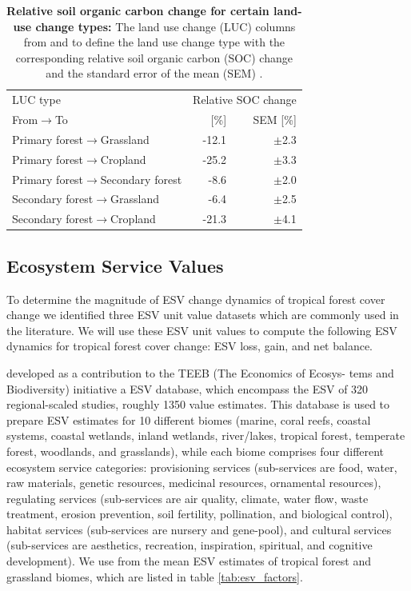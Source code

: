 		\begin{table}[ht]
			\centering
			\caption[Relative soil organic carbon change for certain land-use change types]{\textbf{Relative soil organic carbon change for certain land-use change types:} The land use change (LUC) columns from and to define the land use change type with the corresponding relative soil organic carbon (SOC) change and the standard error of the mean (SEM) \citep{Don2010}.}
			\label{tab:soc_factors}
			\begin{tabular}{lrr}
				\hline
				LUC type & \multicolumn{2}{c}{Relative SOC change} \\\cline{2-3}
				From$\rightarrow$To & [\%] & SEM [\%] \\\hline
				Primary forest$\rightarrow$Grassland & -12.1 & $\pm$2.3 \\
				Primary forest$\rightarrow$Cropland & -25.2 & $\pm$3.3 \\
				Primary forest$\rightarrow$Secondary forest & -8.6 & $\pm$2.0 \\
				Secondary forest$\rightarrow$Grassland & -6.4 & $\pm$2.5 \\
				Secondary forest$\rightarrow$Cropland & -21.3 & $\pm$4.1 \\\hline
			\end{tabular}
		\end{table}

	\subsection{Ecosystem Service Values}
	\label{subsec:methods_data_esv}
		To determine the magnitude of \ac{ESV} change dynamics of tropical forest cover change we identified three \ac{ESV} unit value datasets which are commonly used in the literature. We will use these \ac{ESV} unit values to compute the following \ac{ESV} dynamics for tropical forest cover change: \ac{ESV} loss, gain, and net balance.

		\citet{Groot2012} developed as a contribution to the TEEB (The Economics of Ecosys-
		tems and Biodiversity) initiative a \ac{ESV} database, which encompass the \ac{ESV} of 320 regional-scaled studies, roughly 1350 value estimates. This database is used to prepare \ac{ESV} estimates for 10 different biomes (marine, coral reefs, coastal systems, coastal wetlands, inland wetlands, river/lakes, tropical forest, temperate forest, woodlands, and grasslands), while each biome comprises four different ecosystem service categories: provisioning services (sub-services are food, water, raw materials, genetic resources, medicinal resources, ornamental resources), regulating services (sub-services are air quality, climate, water flow, waste treatment, erosion prevention, soil fertility, pollination, and biological control), habitat services (sub-services are nursery and gene-pool), and cultural services (sub-services are aesthetics, recreation, inspiration, spiritual, and cognitive development). We use from \citet{Groot2012} the mean \ac{ESV} estimates of tropical forest and grassland biomes, which are listed in table \ref{tab:esv_factors}.

